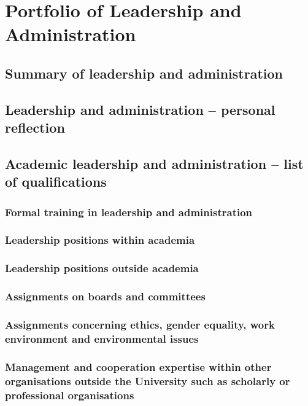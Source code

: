 \chapter{Portfolio of Leadership and Administration}

\section{Summary of leadership and administration} \label{sec:summary-of-leadership-and-administration}

\section{Leadership and administration -- personal reflection} \label{sec:leadership-and-administration-personal-reflection}

\section{Academic leadership and administration -- list of qualifications} \label{sec:academic-leadership-and-administration-list-of-qualifications}

\subsection{Formal training in leadership and administration} \label{ssec:formal-training-in-leadership-and-administration}
\subsection{Leadership positions within academia} \label{ssec:leadership-positions-within-academia}
\subsection{Leadership positions outside academia} \label{ssec:leadership-positions-outside-academia}
\subsection{Assignments on boards and committees} \label{ssec:assignments-on-boards-and-committees}
\subsection{Assignments concerning ethics, gender equality, work environment and environmental issues} \label{ssec:assignments-concerning-ethics-gender-equality-work-environment-and-environmental-issues}
\subsection{Management and cooperation expertise within other organisations outside the University such as scholarly or professional organisations} \label{ssec:management-and-cooperation-expertise-within-other-organisations-outside-the-university-such-as-scholarly-or-professional-organisations}
